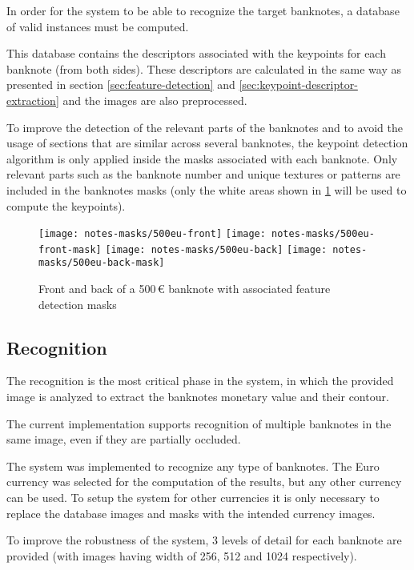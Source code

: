 In order for the system to be able to recognize the target banknotes, a database of valid instances must be computed.

This database contains the descriptors associated with the keypoints for each banknote (from both sides). These descriptors are calculated in the same way as presented in section \cref{sec:feature-detection} and \cref{sec:keypoint-descriptor-extraction} and the images are also preprocessed.

To improve the detection of the relevant parts of the banknotes and to avoid the usage of sections that are similar across several banknotes, the keypoint detection algorithm is only applied inside the masks associated with each banknote. Only relevant parts such as the banknote number and unique textures or patterns are included in the banknotes masks (only the white areas shown in \cref{fig:banknote-feature-detection-mask-500-front} will be used to compute the keypoints).


\begin{figure}[H]
	\centering
	\texttt{[image: notes-masks/500eu-front]}\hfill
	\texttt{[image: notes-masks/500eu-front-mask]}\hfill
	\texttt{[image: notes-masks/500eu-back]}\hfill
	\texttt{[image: notes-masks/500eu-back-mask]}
	\caption{Front and back of a 500\,\euro{} banknote with associated feature detection masks}
	\label{fig:banknote-feature-detection-mask-500-front}
\end{figure}


\subsection{Recognition}

The recognition is the most critical phase in the system, in which the provided image is analyzed to extract the banknotes monetary value and their contour.

The current implementation supports recognition of multiple banknotes in the same image, even if they are partially occluded.

The system was implemented to recognize any type of banknotes. The Euro currency was selected for the computation of the results, but any other currency can be used. To setup the system for other currencies it is only necessary to replace the database images and masks with the intended currency images.

To improve the robustness of the system, 3 levels of detail for each banknote are provided (with images having width of 256, 512 and 1024 respectively).

